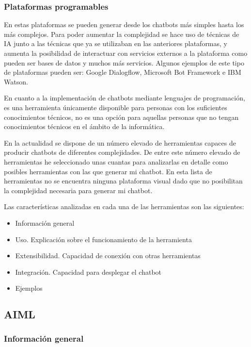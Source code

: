 \subsubsection*{Plataformas programables}

En estas plataformas se pueden generar desde los chatbots más simples hasta los más complejos. Para poder aumentar la complejidad se hace uso de técnicas de \gls{IA} junto a las técnicas que ya se utilizaban en las anteriores plataformas, y aumenta la posibilidad de interactuar con servicios externos a la plataforma como pueden ser bases de datos y muchos más servicios. Algunos ejemplos de este tipo de plataformas pueden ser: Google Dialogflow, Microsoft Bot Framework e IBM Watson. \newline\newline

En cuanto a la implementación de chatbots mediante lenguajes de programación, es una herramienta únicamente disponible para personas con los suficientes conocimientos técnicos, no es una opción para aquellas personas que no tengan conocimientos técnicos en el ámbito de la informática.

En la actualidad se dispone de un número elevado de herramientas capaces de producir chatbots de diferentes complejidades. De entre este número elevado de herramientas he seleccionado unas cuantas para analizarlas en detalle como posibles herramientas con las que generar mi chatbot. En esta lista de herramientas no se encuentra ninguna plataforma visual dado que no posibilitan la complejidad necesaria para generar mi chatbot.

Las características analizadas en cada una de las herramientas son las siguientes:

\begin{itemize}
\item Información general
\item Uso. Explicación sobre el funcionamiento de la herramienta
\item Extensibilidad. Capacidad de conexión con otras herramientas
\item Integración. Capacidad para desplegar el chatbot
\item Ejemplos
\end{itemize}


\subsection{AIML}

\subsubsection*{Información general}

